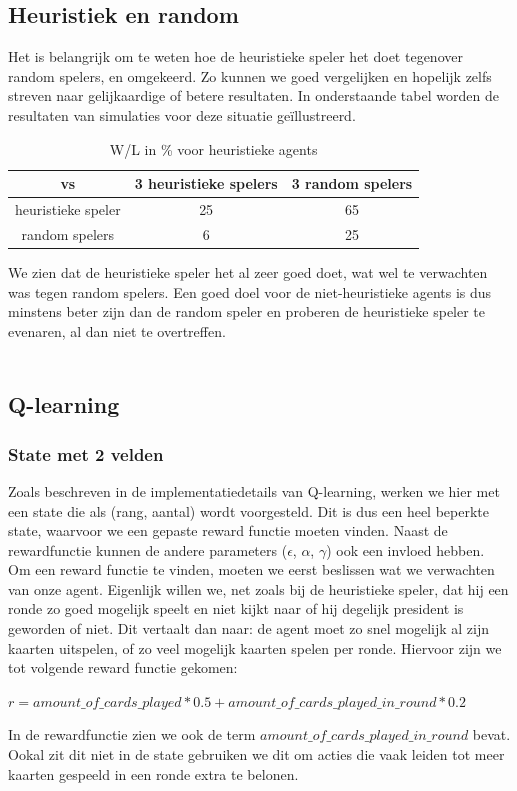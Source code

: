 \documentclass[11pt]{article}
\begin{document}
\subsection{Heuristiek en random}
Het is belangrijk om te weten hoe de heuristieke speler het doet tegenover random spelers, en omgekeerd. Zo kunnen we goed vergelijken en hopelijk zelfs streven naar gelijkaardige of betere resultaten. In onderstaande tabel worden de resultaten van simulaties voor deze situatie geïllustreerd.
\begin{table}[H]
        \centering
        \begin{tabular}{|c|c|c|}
                \hline
                  vs                & 3 heuristieke spelers & 3 random spelers \\
                \hline
                 heuristieke speler & 25         & 65\\
                 random spelers     & 6         & 25\\
                \hline
        \end{tabular}
        \caption{W/L in \% voor heuristieke agents}
\end{table}

We zien dat de heuristieke speler het al zeer goed doet, wat wel te verwachten was tegen random spelers. Een goed doel voor de niet-heuristieke agents is dus minstens beter zijn dan de random speler en proberen de heuristieke speler te evenaren, al dan niet te overtreffen.\\\\


\subsection{Q-learning}
\subsubsection{State met 2 velden}
Zoals beschreven in de implementatiedetails van Q-learning, werken we hier met een state die als (rang, aantal) wordt voorgesteld. Dit is dus een heel beperkte state, waarvoor we een gepaste reward functie moeten vinden. Naast de rewardfunctie kunnen de andere parameters ($\epsilon$, $\alpha$, $\gamma$) ook een invloed hebben.\\

Om een reward functie te vinden, moeten we eerst beslissen wat we verwachten van onze agent. Eigenlijk willen we, net zoals bij de heuristieke speler, dat hij een ronde zo goed mogelijk speelt en niet kijkt naar of hij degelijk president is geworden of niet. Dit vertaalt dan naar: de agent moet zo snel mogelijk al zijn kaarten uitspelen, of zo veel mogelijk kaarten spelen per ronde. Hiervoor zijn we tot volgende reward functie gekomen:
\begin{center}
$r = amount\_of\_cards\_played * 0.5 + amount\_of\_cards\_played\_in\_round * 0.2$
\end{center}
In de rewardfunctie zien we ook de term $amount\_of\_cards\_played\_in\_round$ bevat. Ookal zit dit niet in de state gebruiken we dit om acties die vaak leiden tot meer kaarten gespeeld in een ronde extra te belonen.\\\\
\end{document}
